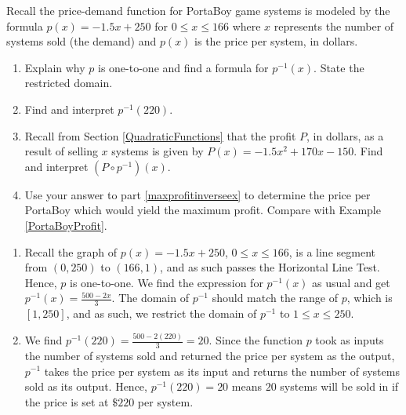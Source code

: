 \documentclass{ximera}
\begin{document}
\begin{example} \label{demandfunctionofprice} Recall the price-demand function for PortaBoy game systems is modeled by the formula $p(x) = -1.5x + 250$ for $0 \leq x \leq 166$  where $x$ represents the number of systems sold (the demand) and $p(x)$ is the price per system, in dollars.  

\begin{enumerate}

\item  Explain why $p$ is one-to-one and find a formula for $p^{-1}(x)$.  State the restricted domain.

\item  Find and interpret $p^{-1}(220)$.

\item  \label{maxprofitinverseex} Recall from Section \ref{QuadraticFunctions} that the  profit $P$, in dollars, as a result of selling $x$ systems is given by $P(x)= -1.5x^2+170x-150$.  Find and interpret $\left( P \circ p^{-1}\right)(x)$.  

\item  Use your answer to part \ref{maxprofitinverseex} to determine the price per PortaBoy which would yield the maximum profit.  Compare with Example \ref{PortaBoyProfit}.

\end{enumerate}

\begin{explanation}

\begin{enumerate}

\item  Recall the graph of $p(x) = -1.5x + 250$, $0 \leq x \leq 166$, is a line segment from $(0,250)$ to $(166,1)$, and as such passes the Horizontal Line Test.  Hence, $p$ is one-to-one.  We find the expression for $p^{-1}(x)$ as usual and get $p^{-1}(x) =  \frac{500-2x}{3}$.  The domain of $p^{-1}$ should match the range of $p$, which is $[1,250]$, and as such, we restrict the domain of $p^{-1}$ to $1 \leq x \leq 250$.  

\item  We find $p^{-1}(220) = \frac{500-2(220)}{3} = 20$.  Since the function $p$ took as inputs the number of systems sold and returned the price per system as the output, $p^{-1}$ takes the price per system as its input and returns the number of systems sold as its output.  Hence, $p^{-1}(220) = 20$ means $20$ systems will be sold in if the price is set at $\$ 220$ per system.


\end{enumerate}
\end{explanation}
\end{example}
\end{document}
